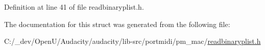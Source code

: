 Definition at line 41 of file readbinaryplist.\+h.



The documentation for this struct was generated from the following file\+:\begin{DoxyCompactItemize}
\item 
C\+:/\+\_\+dev/\+Open\+U/\+Audacity/audacity/lib-\/src/portmidi/pm\+\_\+mac/\hyperlink{readbinaryplist_8h}{readbinaryplist.\+h}\end{DoxyCompactItemize}
